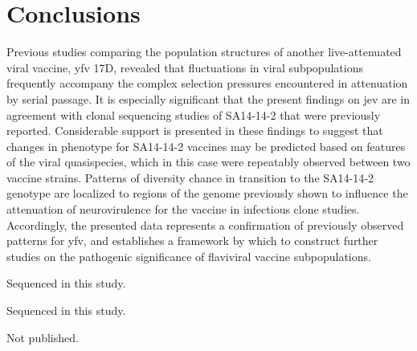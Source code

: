 \section{Conclusions}
Previous studies comparing the population structures of another live-attenuated viral vaccine, \gls{yfv} 17D, revealed that fluctuations in viral subpopulations frequently accompany the complex selection pressures encountered in attenuation by serial passage. It is especially significant that the present findings on \gls{jev} are in agreement with clonal sequencing studies of SA14-14-2 that were previously reported. Considerable support is presented in these findings to suggest that changes in phenotype for SA14-14-2 vaccines may be predicted based on features of the viral quasispecies, which in this case were repeatably observed between two vaccine strains. Patterns of diversity chance in transition to the SA14-14-2 genotype are localized to regions of the genome previously shown to influence the attenuation of neurovirulence for the vaccine in infectious clone studies. Accordingly, the presented data represents a confirmation of previously observed patterns for \gls{yfv}, and establishes a framework by which to construct further studies on the pathogenic significance of flaviviral vaccine subpopulations.




\clearpage
\begin{table}[h]
	\centering
	\begin{ThreePartTable}
		\caption{Amino acid substitutions differentiating the SA14 strain sequenced in this study to 
			that of three others previously reported.}
		
		\begin{tablenotes}
			\item[a] Sequenced in this study.
			\item[b] \parencite{Nitayaphan:1990vr}
			\item[c] \parencite{Aihara:1991tn}
			\item[d] \parencite{Ni:1994vs}		
		\end{tablenotes}
	\label{JEV_SA14_consensus}
	\end{ThreePartTable}
\end{table}

\clearpage
	\begin{ThreePartTable}
		\taburowcolors [3]1{gray!20 .. white}
		
		\begin{tablenotes}
			\item[a] Sequenced in this study.	
			\item[b] Not published.
			\item[c] \parencite{Aihara:1991tn}
			\item[d] \parencite{Song:2012iw}
		\end{tablenotes}
	\label{JEV_main_consensus}
	\end{ThreePartTable}
	

